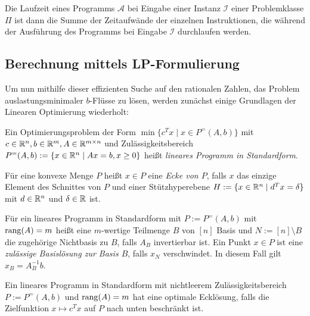 Die Laufzeit eines Programms $\mathcal{A}$ bei Eingabe einer Instanz $\mathcal{I}$ einer Problemklasse $\Pi$ ist dann die Summe der Zeitaufwände der einzelnen Instruktionen, die während der Ausführung des Programms bei Eingabe $\mathcal{I}$ durchlaufen werden.



\subsection{Berechnung mittels LP-Formulierung}

Um nun mithilfe dieser effizienten Suche auf den rationalen Zahlen, das Problem auslastungsminimaler $b$-Flüsse zu lösen, werden zunächst einige Grundlagen der Linearen Optimierung wiederholt:
\begin{definition}
	Ein Optimierungsproblem der Form $\min\{ c^T x \mid x \in P^=(A, b) \}$ mit $c\in\mathbb{R}^n, b\in\mathbb{R}^m, A\in\mathbb{R}^{m\times n}$ und Zulässigkeitsbereich $P^=(A,b):= \{ x\in\mathbb{R}^n \mid Ax = b, x\geq 0 \}$ heißt \emph{lineares Programm in Standardform}.
\end{definition}

\begin{definition}
	Für eine konvexe Menge $P$ heißt $x\in P$ eine \emph{Ecke von $P$}, falls $x$ das einzige Element des Schnittes von $P$ und einer Stützhyperebene $H:=\{ x\in\mathbb{R}^n \mid d^T x = \delta \}$ mit $d\in\mathbb{R}^n$ und $\delta\in\mathbb{R}$ ist.
\end{definition}

\begin{definition}
Für ein lineares Programm in Standardform mit $P:=P^=(A, b)$ mit $\operatorname{rang}(A) = m$ heißt eine $m$-wertige Teilmenge $B$ von $[n]$ Basis und $N:= [n]\setminus B$ die zugehörige Nichtbasis zu $B$, falls $A_B$ invertierbar ist.
Ein Punkt $x\in P$ ist eine \emph{zulässige Basislösung zur Basis $B$}, falls $x_N$ verschwindet.
In diesem Fall gilt $x_B = A_B^{-1} b$.
\end{definition}

\begin{satz}\label{satz-existence-optimality-for-lps}
	Ein lineares Programm in Standardform mit nichtleerem Zulässigkeitsbereich $P:=P^=(A,b)$ und $\operatorname{rang}(A) = m$ hat eine optimale Ecklösung, falls die Zielfunktion $x\mapsto c^T x$ auf $P$ nach unten beschränkt ist.
\end{satz}


